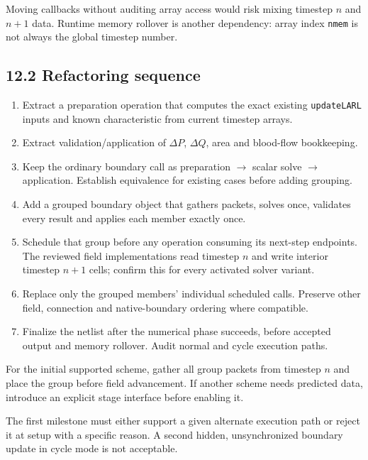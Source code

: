 \documentclass[11pt,a4paper]{article}
\begin{document}
Moving callbacks without auditing array access would risk mixing timestep \(n\) and \(n+1\) data. Runtime memory rollover is another dependency: array index \texttt{nmem} is not always the global timestep number.

\subsection{12.2 Refactoring sequence}

\begin{enumerate}
\item Extract a preparation operation that computes the exact existing \texttt{update\allowbreak{}LARL} inputs and known characteristic from current timestep arrays.


\item Extract validation/application of \(\Delta P\), \(\Delta Q\), area and blood-flow bookkeeping.


\item Keep the ordinary boundary call as preparation \ensuremath{\rightarrow} scalar solve \ensuremath{\rightarrow} application. Establish equivalence for existing cases before adding grouping.


\item Add a grouped boundary object that gathers packets, solves once, validates every result and applies each member exactly once.


\item Schedule that group before any operation consuming its next-step endpoints. The reviewed field implementations read timestep \(n\) and write interior timestep \(n+1\) cells; confirm this for every activated solver variant.


\item Replace only the grouped members' individual scheduled calls. Preserve other field, connection and native-boundary ordering where compatible.


\item Finalize the netlist after the numerical phase succeeds, before accepted output and memory rollover. Audit normal and cycle execution paths.


\end{enumerate}
For the initial supported scheme, gather all group packets from timestep \(n\) and place the group before field advancement. If another scheme needs predicted data, introduce an explicit stage interface before enabling it.

The first milestone must either support a given alternate execution path or reject it at setup with a specific reason. A second hidden, unsynchronized boundary update in cycle mode is not acceptable.
\end{document}
